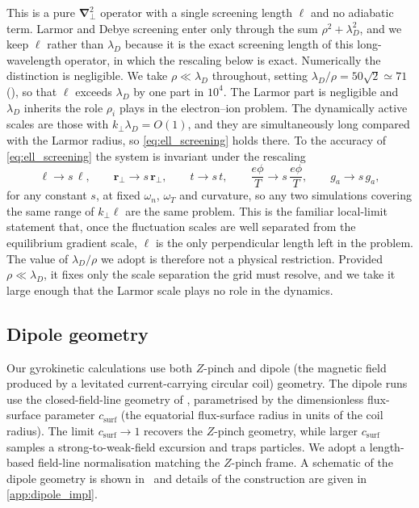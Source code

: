 \documentclass{jpp}
\newcommand{\order}[1]{O\left(#1\right)}
\renewcommand{\vec}[1]{\boldsymbol{#1}}
\newcommand{\vec}[1]{\boldsymbol{#1}}
\newcommand{\grad}{{\vec{\nabla}}}
\renewcommand{\vr}{{\vec{r}}}
\newcommand{\vr}{{\vec{r}}}
\newcommand{\kperp}{k_\perp}
\newcommand{\lambdaD}{\lambda_D}
\begin{document}
This is a pure $\grad_\perp^2$ operator with a single screening length $\ell$ and no adiabatic term. Larmor and Debye screening enter only through the sum $\rho^2 + \lambdaD^2$, and we keep $\ell$ rather than $\lambdaD$ because it is the exact screening length of this long-wavelength operator, in which the rescaling below is exact. Numerically the distinction is negligible. We take $\rho \ll \lambdaD$ throughout, setting $\lambdaD/\rho = 50\sqrt{2} \simeq 71$ (), so that $\ell$ exceeds $\lambdaD$ by one part in $10^4$. The Larmor part is negligible and $\lambdaD$ inherits the role $\rho_i$ plays in the electron--ion problem. The dynamically active scales are those with $\kperp\lambdaD = \order{1}$, and they are simultaneously long compared with the Larmor radius, so \cref{eq:ell_screening} holds there. To the accuracy of \cref{eq:ell_screening} the system is invariant under the rescaling
\begin{equation}\label{eq:ell_mapping}
\ell \to s\,\ell,
\qquad
\vr_\perp \to s\,\vr_\perp,
\qquad
t \to s\,t,
\qquad
\frac{e\phi}{T} \to s\,\frac{e\phi}{T},
\qquad
g_a \to s\,g_a,
\end{equation}
for any constant $s$, at fixed $\omega_n$, $\omega_T$ and curvature, so any two simulations covering the same range of $\kperp\ell$ are the same problem. This is the familiar local-limit statement that, once the fluctuation scales are well separated from the equilibrium gradient scale, $\ell$ is the only perpendicular length left in the problem. The value of $\lambdaD/\rho$ we adopt is therefore not a physical restriction. Provided $\rho \ll \lambdaD$, it fixes only the scale separation the grid must resolve, and we take it large enough that the Larmor scale plays no role in the dynamics.

\subsection{Dipole geometry}\label{sec:dipole_setup}

Our gyrokinetic calculations use both $Z$-pinch and dipole (the magnetic field produced by a levitated current-carrying circular coil) geometry. The dipole runs use the closed-field-line geometry of \citet{Kennedy2020}, parametrised by the dimensionless flux-surface parameter $c_\mathrm{surf}$ (the equatorial flux-surface radius in units of the coil radius). The limit $c_\mathrm{surf} \rightarrow 1$ recovers the $Z$-pinch geometry, while larger $c_\mathrm{surf}$ samples a strong-to-weak-field excursion and traps particles. We adopt a length-based field-line normalisation matching the $Z$-pinch frame. A schematic of the dipole geometry is shown in~ and details of the construction are given in \cref{app:dipole_impl}.
\end{document}
